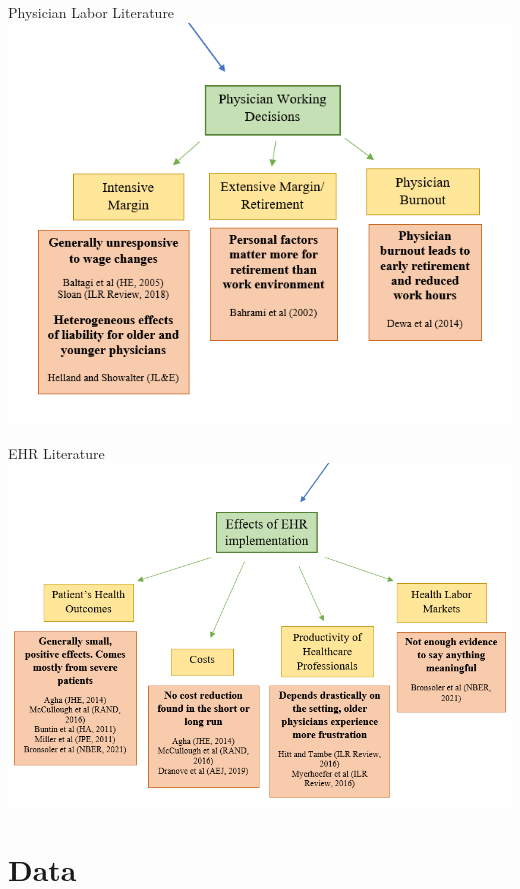 \documentclass[10pt]{beamer}
\begin{document}
\begin{frame}{Physician Labor Literature}
\centering
    \includegraphics[scale=.45]{graphics/labor_litgraphic.PNG}
\end{frame}

\begin{frame}{EHR Literature}
    \centering
    \includegraphics[scale=.45]{graphics/EHR_litgraphic.PNG}
\end{frame}


\section{Data}
\end{document}
